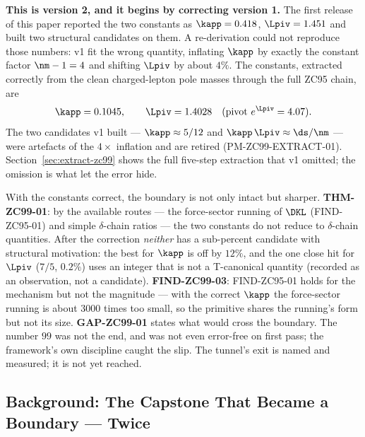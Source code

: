 \documentclass[12pt, a4paper]{article}
\begin{document}
\textbf{This is version 2, and it begins by correcting version 1.} The first
release of this paper reported the two constants as $\kapp=0.418$, $\Lpiv=1.451$
and built two structural candidates on them. A re-derivation could not reproduce
those numbers: v1 fit the wrong quantity, inflating $\kapp$ by exactly the
constant factor $\nm-1=4$ and shifting $\Lpiv$ by about $4\%$. The constants,
extracted correctly from the clean charged-lepton pole masses through the full
ZC95 chain, are
\[
  \kapp = 0.1045, \qquad \Lpiv = 1.4028 \quad (\text{pivot } e^{\Lpiv}=4.07).
\]
The two candidates v1 built --- $\kapp\approx 5/12$ and $\kapp\,\Lpiv\approx
\ds/\nm$ --- were artefacts of the $4\times$ inflation and are retired
(PM-ZC99-EXTRACT-01). Section~\ref{sec:extract-zc99} shows the full five-step
extraction that v1 omitted; the omission is what let the error hide.

With the constants correct, the boundary is not only intact but sharper.
\textbf{THM-ZC99-01}: by the available routes --- the force-sector running of
$\DKL$ (FIND-ZC95-01) and simple $\delta$-chain ratios --- the two constants do
not reduce to $\delta$-chain quantities. After the correction \emph{neither} has
a sub-percent candidate with structural motivation: the best for $\kapp$ is off
by $12\%$, and the one close hit for $\Lpiv$ ($7/5$, $0.2\%$) uses an integer
that is not a T-canonical quantity (recorded as an observation, not a
candidate). \textbf{FIND-ZC99-03}: FIND-ZC95-01 holds for the mechanism but not
the magnitude --- with the correct $\kapp$ the force-sector running is about
$3000$ times too small, so the primitive shares the running's form but not its
size. \textbf{GAP-ZC99-01} states what would cross the boundary. The number
$99$ was not the end, and was not even error-free on first pass; the framework's
own discipline caught the slip. The tunnel's exit is named and measured; it is
not yet reached.


\subsection{Background: The Capstone That Became a Boundary --- Twice}
\label{sec:background-zc99}
\end{document}
